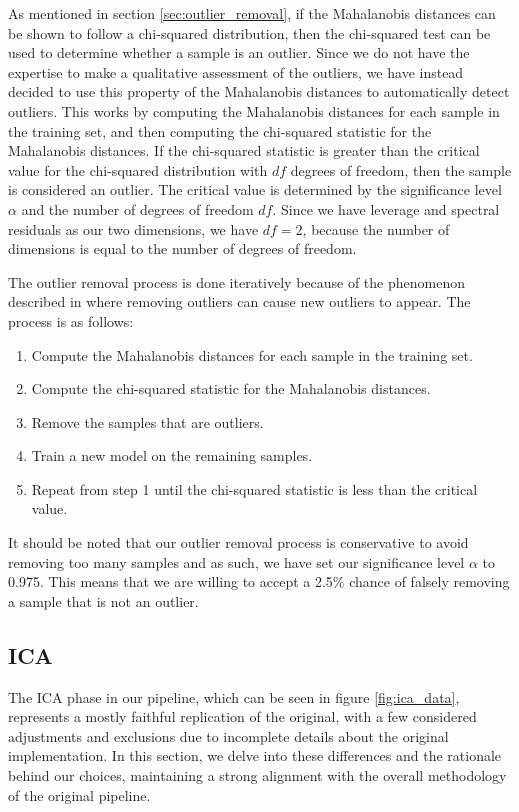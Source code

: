 As mentioned in section \ref{sec:outlier_removal}, if the Mahalanobis distances can be shown to follow a chi-squared distribution, then the chi-squared test can be used to determine whether a sample is an outlier.
Since we do not have the expertise to make a qualitative assessment of the outliers, we have instead decided to use this property of the Mahalanobis distances to automatically detect outliers.
This works by computing the Mahalanobis distances for each sample in the training set, and then computing the chi-squared statistic for the Mahalanobis distances.
If the chi-squared statistic is greater than the critical value for the chi-squared distribution with $df$ degrees of freedom, then the sample is considered an outlier.
The critical value is determined by the significance level $\alpha$ and the number of degrees of freedom $df$.
Since we have leverage and spectral residuals as our two dimensions, we have $df = 2$, because the number of dimensions is equal to the number of degrees of freedom\cite{aggarwal_outlier_2017}.

The outlier removal process is done iteratively because of the phenomenon described in \citeauthor{cleggRecalibrationMarsScience2017} where removing outliers can cause new outliers to appear.
The process is as follows:
\begin{enumerate}
	\item Compute the Mahalanobis distances for each sample in the training set.
	\item Compute the chi-squared statistic for the Mahalanobis distances.
	\item Remove the samples that are outliers.
	\item Train a new model on the remaining samples.
	\item Repeat from step 1 until the chi-squared statistic is less than the critical value.
\end{enumerate}

It should be noted that our outlier removal process is conservative to avoid removing too many samples and as such, we have set our significance level $\alpha$ to 0.975.
This means that we are willing to accept a 2.5\% chance of falsely removing a sample that is not an outlier.

\subsection{ICA}
The ICA phase in our pipeline, which can be seen in figure \ref{fig:ica_data}, represents a mostly faithful replication of the original, with a few considered adjustments and exclusions due to incomplete details about the original implementation.
In this section, we delve into these differences and the rationale behind our choices, maintaining a strong alignment with the overall methodology of the original pipeline.

